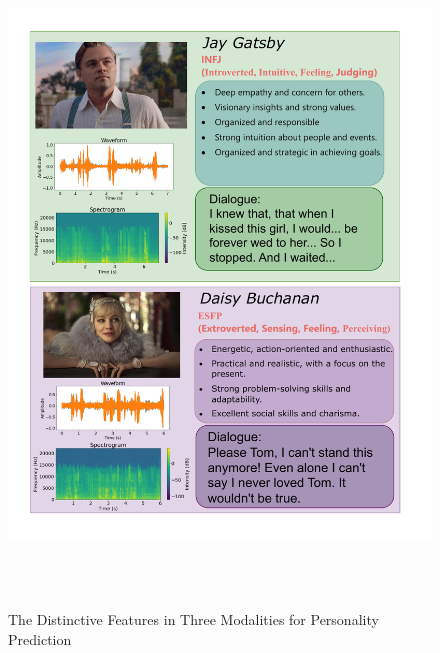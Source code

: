 \begin{figure}[th]
  \centering
  \includegraphics[width=\linewidth]{images/example.pdf}
  \caption{The Distinctive Features in Three Modalities for Personality Prediction}
  \label{fig:example}
\end{figure}

  
  

